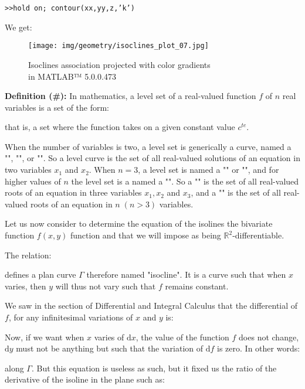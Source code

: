{	
	\texttt{>>hold on; contour(xx,yy,z,'k')}
	
	We get:
	\begin{figure}[H]
		\centering
		\texttt{[image: img/geometry/isoclines\_plot\_07.jpg]}
		\caption{Isoclines association projected with color gradients \\in MATLAB™ 5.0.0.473}
	\end{figure}
	\textbf{Definition (\#\mydef):} In mathematics, a level set of a real-valued function $f$ of $n$ real variables is a set of the form:
	
	that is, a set where the function takes on a given constant value $c^{te}$.
	
	When the number of variables is two, a level set is generically a curve, named a "", "", or "". So a level curve is the set of all real-valued solutions of an equation in two variables $x_1$ and $x_2$. When $n = 3$, a level set is named a "" or "", and for higher values of $n$ the level set is a named a "". So a "" is the set of all real-valued roots of an equation in three variables $x_1, x_2$ and $x_3$, and a "" is the set of all real-valued roots of an equation in $n\; (n > 3)$ variables.
	
	Let us now consider to determine the equation of the isolines the bivariate function $f(x,y)$ function and that we will impose as being $\mathbb{R}^2$-differentiable.
	
	The relation:
	
	defines a plan curve $\Gamma$ therefore named "isocline". It is a curve such that when $x$ varies, then $y$ will thus not vary such that $f$ remains constant.
	
	We saw in the section of Differential and Integral Calculus that the differential of $f$, for any infinitesimal variations of $x$ and $y$ is:
	
	Now, if we want when $x$ varies of $\mathrm{d}x$, the value of the function $f$ does not change, $\mathrm{d}y$ must not be anything but such that the variation of $\mathrm{d}f$ is zero. In other words:
	
	along $\Gamma$. But this equation is useless as such, but it fixed us the ratio of the derivative of the isoline in the plane such as:
	
}
